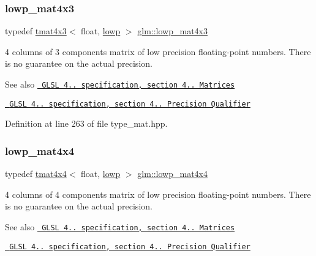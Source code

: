 \subsubsection{\texorpdfstring{lowp\_mat4x3}{lowp\_mat4x3}}
{\footnotesize\ttfamily typedef \mbox{\hyperlink{structglm_1_1tmat4x3}{tmat4x3}}$<$ float, \mbox{\hyperlink{namespaceglm_a0f04f086094c747d227af4425893f545ae161af3fc695e696ce3bf69f7332bc2d}{lowp}} $>$ \mbox{\hyperlink{group__core__precision_ga4649624907ac00347237476ead4178e1}{glm\+::lowp\+\_\+mat4x3}}}

4 columns of 3 components matrix of low precision floating-\/point numbers. There is no guarantee on the actual precision.

\begin{DoxySeeAlso}{See also}
\href{http://www.opengl.org/registry/doc/GLSLangSpec.4.20.8.pdf}{\texttt{ G\+L\+SL 4.. specification, section 4.. Matrices}} 

\href{http://www.opengl.org/registry/doc/GLSLangSpec.4.20.8.pdf}{\texttt{ G\+L\+SL 4.. specification, section 4.. Precision Qualifier}} 
\end{DoxySeeAlso}


Definition at line 263 of file type\+\_\+mat.\+hpp.

\mbox{\label{group__core__precision_ga83e14edb4422871bdc644f4209b5f9ff}} 
\subsubsection{\texorpdfstring{lowp\_mat4x4}{lowp\_mat4x4}}
{\footnotesize\ttfamily typedef \mbox{\hyperlink{structglm_1_1tmat4x4}{tmat4x4}}$<$ float, \mbox{\hyperlink{namespaceglm_a0f04f086094c747d227af4425893f545ae161af3fc695e696ce3bf69f7332bc2d}{lowp}} $>$ \mbox{\hyperlink{group__core__precision_ga83e14edb4422871bdc644f4209b5f9ff}{glm\+::lowp\+\_\+mat4x4}}}

4 columns of 4 components matrix of low precision floating-\/point numbers. There is no guarantee on the actual precision.

\begin{DoxySeeAlso}{See also}
\href{http://www.opengl.org/registry/doc/GLSLangSpec.4.20.8.pdf}{\texttt{ G\+L\+SL 4.. specification, section 4.. Matrices}} 

\href{http://www.opengl.org/registry/doc/GLSLangSpec.4.20.8.pdf}{\texttt{ G\+L\+SL 4.. specification, section 4.. Precision Qualifier}} 
\end{DoxySeeAlso}


